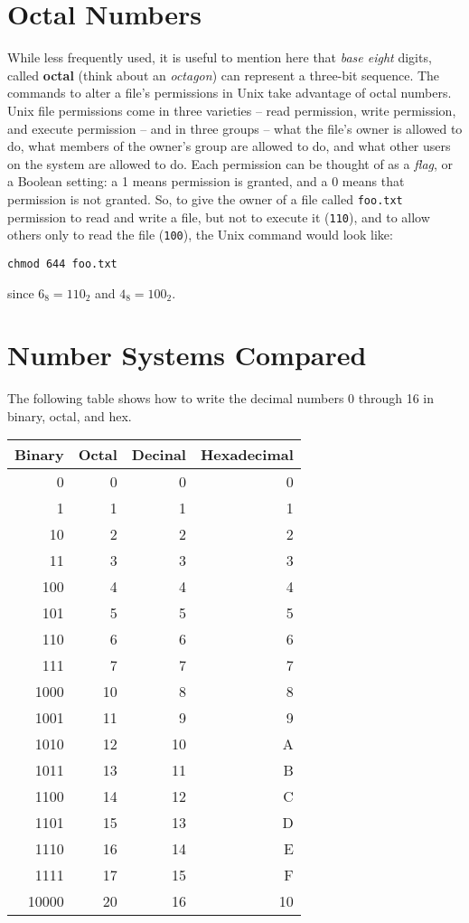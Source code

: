 \setcounter{section}{7}
\section{Octal Numbers}

While less frequently used, it is useful to mention here that \textit{base eight} digits, called \textbf{octal} (think about an \textit{octagon}) can represent a three-bit sequence.  The commands to alter a file's permissions in Unix take advantage of octal numbers.  Unix file permissions come in three varieties -- read permission, write permission, and execute permission -- and in three groups -- what the file's owner is allowed to do, what members of the owner's group are allowed to do, and what other users on the system are allowed to do.  Each permission can be thought of as a \textit{flag}, or a Boolean setting: a 1 means permission is granted, and a 0 means that permission is not granted.  So, to give the owner of a file called \texttt{foo.txt} permission to read and write a file, but not to execute it (\texttt{110}), and to allow others only to read the file (\texttt{100}), the Unix command would look like:

\begin{center}\texttt{chmod 644 foo.txt}\end{center}

since $6_8 = 110_2$ and $4_8 = 100_2$.

\section*{Number Systems Compared}

The following table shows how to write the decimal numbers 0 through 16 in binary, octal, and hex.

\begin{center}
\begin{tabular}{rrrr}
\textbf{Binary} & \textbf{Octal} & \textbf{Decinal} & \textbf{Hexadecimal}\\
\hline
0 & 0 & 0 & 0\\
1 & 1 & 1 & 1\\
10 & 2 & 2 & 2\\
11 & 3 & 3 & 3\\
100 & 4 & 4 & 4\\
101 & 5 & 5 & 5\\
110 & 6 & 6 & 6\\
111 & 7 & 7 & 7\\
1000 & 10 & 8 & 8\\
1001 & 11 & 9 & 9\\
1010 & 12 & 10 & A\\
1011 & 13 & 11 & B\\
1100 & 14 & 12 & C\\
1101 & 15 & 13 & D\\
1110 & 16 & 14 & E\\
1111 & 17 & 15 & F\\
10000 & 20 & 16 & 10\\
\end{tabular}
\end{center}
